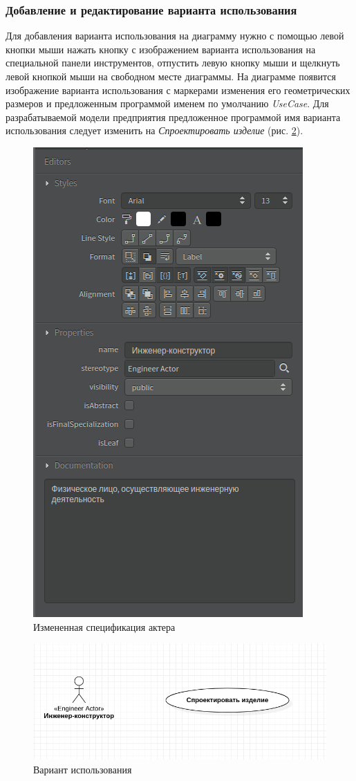 \documentclass[a4paper,12pt]{extreport}
\begin{document}
\subsubsection{Добавление и редактирование варианта использования}
Для добавления варианта использования на диаграмму нужно с помощью левой кнопки мыши нажать кнопку с изображением варианта использования на специальной панели инструментов, отпустить левую кнопку мыши и щелкнуть левой кнопкой мыши на свободном месте диаграммы. На диаграмме появится изображение варианта использования с маркерами изменения его геометрических размеров и предложенным программой именем по умолчанию \textit{UseCase}. Для разрабатываемой модели предприятия предложенное программой имя варианта использования следует изменить на \textit{Спроектировать изделие} (рис. \ref{fig:usecaseproectdaction}).
\newpage
\begin{figure}[h!]
	\centering
	\includegraphics[width=0.35\linewidth]{images/actor1editors2}
	\caption{Измененная спецификация актера}
	\label{fig:actor1editors2}
\end{figure}

\begin{figure}[h!]
	\centering
	\includegraphics[width=0.8\linewidth]{images/usecaseproectdaction}
	\caption{Вариант использования}
	\label{fig:usecaseproectdaction}
\end{figure}
\end{document}

